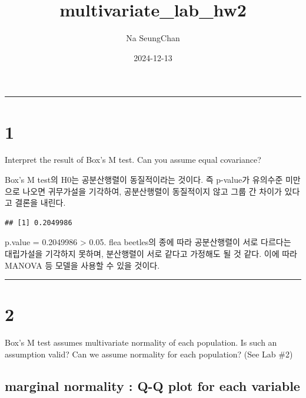 \documentclass[
]{article}
\title{multivariate\_lab\_hw2}
\author{Na SeungChan}
\date{2024-12-13}
\newenvironment{Shaded}{\begin{snugshade}}{\end{snugshade}}
\newcommand{\AttributeTok}[1]{\textcolor[rgb]{0.13,0.29,0.53}{#1}}
\newcommand{\DecValTok}[1]{\textcolor[rgb]{0.00,0.00,0.81}{#1}}
\newcommand{\FunctionTok}[1]{\textcolor[rgb]{0.13,0.29,0.53}{\textbf{#1}}}
\newcommand{\NormalTok}[1]{#1}
\newcommand{\OtherTok}[1]{\textcolor[rgb]{0.56,0.35,0.01}{#1}}
\newcommand{\SpecialCharTok}[1]{\textcolor[rgb]{0.81,0.36,0.00}{\textbf{#1}}}
\begin{document}
\maketitle

\begin{center}\rule{0.5\linewidth}{0.5pt}\end{center}

\section{1}\label{section}

Interpret the result of Box's M test. Can you assume equal covariance?

Box's M test의 H0는 공분산행렬이 동질적이라는 것이다. 즉 p-value가
유의수준 미만으로 나오면 귀무가설을 기각하여, 공분산행렬이 동질적이지
않고 그룹 간 차이가 있다고 결론을 내린다.

\begin{Shaded}
\end{Shaded}

\begin{verbatim}
## [1] 0.2049986
\end{verbatim}

p.value = 0.2049986 \textgreater{} 0.05. flea beetles의 종에 따라
공분산행렬이 서로 다르다는 대립가설을 기각하지 못하며, 분산행렬이 서로
같다고 가정해도 될 것 같다. 이에 따라 MANOVA 등 모델을 사용할 수 있을
것이다.

\begin{center}\rule{0.5\linewidth}{0.5pt}\end{center}

\section{2}\label{section-1}

Box's M test assumes multivariate normality of each population. Is such
an assumption valid? Can we assume normality for each population? (See
Lab \#2)

\subsection{marginal normality : Q-Q plot for each
variable}\label{marginal-normality-q-q-plot-for-each-variable}
\end{document}

